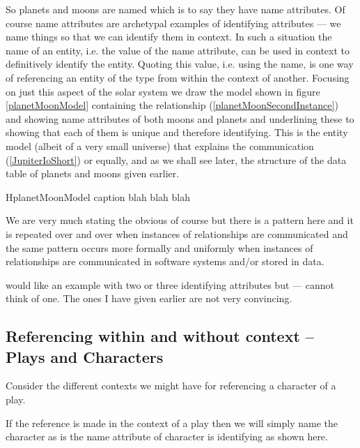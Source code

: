 \mynote So planets and moons are named which is to say they have name attributes.
Of course name attributes are archetypal examples of identifying attributes --- we name things so that we can identify them in context. In such a situation the name of an entity, i.e. the value of the name attribute,  can be used in context to definitively identify the entity.
Quoting this value, i.e. using the name, is one way of referencing an entity of the type from within the context of another.
 \mynote
Focusing on just this aspect of the solar system we  draw the model shown in figure
\ref{planetMoonModel}
containing the relationship (\ref{planetMoonSecondInstance}) and showing name attributes of both moons and planets and
underlining these to showing that each of them is unique and therefore identifying. 
This is the entity model (albeit of a very small universe) that explains the communication (\ref{JupiterIoShort}) or equally, and as we shall see later, the structure of the data table of planets and moons given earlier.
\begin{erboxedFigure} {H}{planetMoonModel}
{
caption blah blah blah
 }

\end{erboxedFigure}
\mynote
We are very much stating the obvious of course but there is a pattern here and it is repeated over and over when instances of relationships are communicated  and the same pattern occurs more formally  and uniformly when instances of relationships are communicated in software systems and/or stored in data.

\begin{noteforfuture}
would like an example with two or three identifying attributes but --- cannot think of one. The ones I have given earlier are not very convincing.
\end{noteforfuture}

\subsection{Referencing within and without context -- Plays and Characters}
Consider the different contexts we might have for referencing a character of a play.

\mynote
If the reference is made in the context of a play then we will simply name the character as is the name attribute of character is identifying as shown here.

